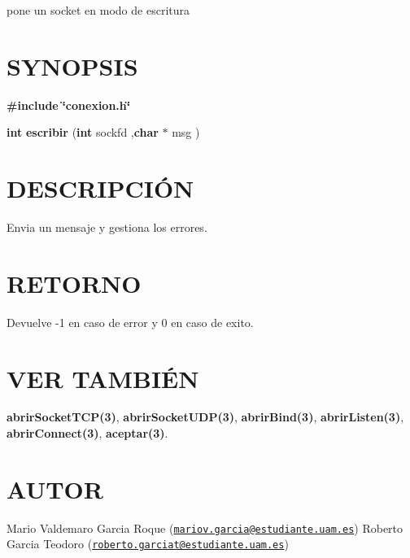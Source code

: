 pone un socket en modo de escritura\hypertarget{cerrar_canal__s_s_l_SYNOPSIS}{}\section{S\-Y\-N\-O\-P\-S\-I\-S}\label{cerrar_canal__s_s_l_SYNOPSIS}
{\bfseries \#include} {\bfseries \char`\"{}conexion.\-h\char`\"{}} 

{\bfseries int} {\bfseries escribir} {\bfseries }({\bfseries int} sockfd ,{\bfseries char} $\ast$ msg {\bfseries })\hypertarget{cerrar_canal__s_s_l_descripcion}{}\section{D\-E\-S\-C\-R\-I\-P\-C\-IÓ\-N}\label{cerrar_canal__s_s_l_descripcion}
Envia un mensaje y gestiona los errores.\hypertarget{cerrar_canal__s_s_l_retorno}{}\section{R\-E\-T\-O\-R\-N\-O}\label{cerrar_canal__s_s_l_retorno}
Devuelve -\/1 en caso de error y 0 en caso de exito.\hypertarget{cerrar_canal__s_s_l_seealso}{}\section{V\-E\-R T\-A\-M\-B\-IÉ\-N}\label{cerrar_canal__s_s_l_seealso}
{\bfseries abrir\-Socket\-T\-C\-P(3)}, {\bfseries abrir\-Socket\-U\-D\-P(3)}, {\bfseries abrir\-Bind(3)}, {\bfseries abrir\-Listen(3)}, {\bfseries abrir\-Connect(3)}, {\bfseries aceptar(3)}. \hypertarget{cerrar_canal__s_s_l_authors}{}\section{A\-U\-T\-O\-R}\label{cerrar_canal__s_s_l_authors}
Mario Valdemaro Garcia Roque (\href{mailto:mariov.garcia@estudiante.uam.es}{\tt mariov.\-garcia@estudiante.\-uam.\-es}) Roberto Garcia Teodoro (\href{mailto:roberto.garciat@estudiante.uam.es}{\tt roberto.\-garciat@estudiante.\-uam.\-es}) 